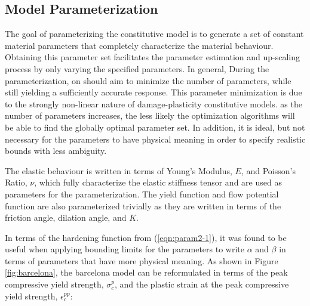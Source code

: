 \subsection{Model Parameterization}

The goal of parameterizing the constitutive model is to generate a set of constant material parameters that completely characterize the material behaviour. Obtaining this parameter set facilitates the parameter estimation and up-scaling process by only varying the specified parameters. In general, During the parameterization, on should aim to minimize the number of parameters, while still yielding a sufficiently accurate response. This parameter minimization is due to the strongly non-linear nature of damage-plasticity constitutive models. as the number of parameters increases, the less likely the optimization algorithms will be able to find the globally optimal parameter set. In addition, it is ideal, but not necessary for the parameters to have physical meaning in order to specify realistic bounds with less ambiguity.

The elastic behaviour is written in terms of Young's Modulus, $E$, and Poisson's Ratio, $\nu$, which fully characterize the elastic stiffness tensor and are used as parameters for the parameterization. The yield function and flow potential function are also parameterized trivially as they are written in terms of the friction angle, dilation angle, and $K$.

In terms of the hardening function from (\ref{eqn:param2-1}), it was found to be useful when applying bounding limits for the parameters to write $\alpha$ and $\beta$ in terms of parameters that have more physical meaning.  As shown in Figure \ref{fig:barcelona}, the barcelona model can be reformulated in terms of the peak compressive yield strength, $\sigma_{c}^{p}$, and the plastic strain at the peak compressive yield strength, $\epsilon_c^{pp}$:
